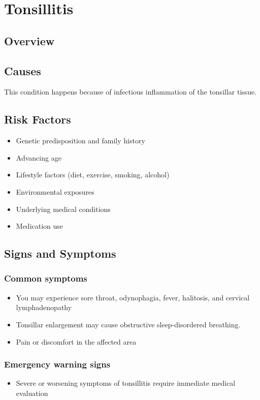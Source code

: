 \chapter{Tonsillitis}
\label{sec:Tonsillitis}

\section{Overview}

\section{Causes}
This condition happens because of infectious inflammation of the tonsillar tissue.     
\section{Risk Factors}

\begin{itemize}[noitemsep]
  \item Genetic predisposition and family history
  \item Advancing age
  \item Lifestyle factors (diet, exercise, smoking, alcohol)
  \item Environmental exposures
  \item Underlying medical conditions
  \item Medication use
\end{itemize}
\section{Signs and Symptoms}

\subsection{Common symptoms}
\begin{itemize}[noitemsep]
  \item You may experience sore throat, odynophagia, fever, halitosis, and cervical lymphadenopathy
  \item Tonsillar enlargement may cause obstructive sleep-disordered breathing.
  \item Pain or discomfort in the affected area
  \end{itemize}

\subsection{Emergency warning signs}
\begin{itemize}[noitemsep]
  \item Severe or worsening symptoms of tonsillitis require immediate medical evaluation
\end{itemize}
